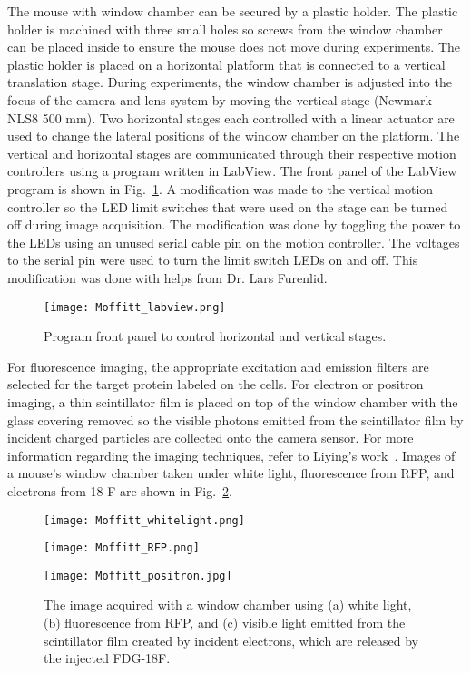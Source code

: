 The mouse with window chamber can be secured by a plastic holder.  The plastic holder is machined with three small holes so screws from the window chamber can be placed inside to ensure the mouse does not move during experiments.  The plastic holder is placed on a horizontal platform that is connected to a vertical translation stage.  During experiments, the window chamber is adjusted into the focus of the camera and lens system by moving the vertical stage (Newmark NLS8 500 mm).  Two horizontal stages each controlled with a linear actuator are used to change the lateral positions of the window chamber on the platform.  The vertical and horizontal stages are communicated through their respective motion controllers using a program written in LabView.  The front panel of the LabView program is shown in Fig.~\ref{fig:Labview}.  A modification was made to the vertical motion controller so the LED limit switches that were used on the stage can be turned off during image acquisition.  The modification was done by toggling the power to the LEDs using an unused serial cable pin on the motion controller.  The voltages to the serial pin were used to turn the limit switch LEDs on and off.  This modification was done with helps from Dr. Lars Furenlid.

\begin{figure}
\centering
\texttt{[image: Moffitt\_labview.png]}
\caption{Program front panel to control horizontal and vertical stages.}
\label{fig:Labview}
\end{figure}

For fluorescence imaging, the appropriate excitation and emission filters are selected for the target protein labeled on the cells.  For electron or positron imaging, a thin scintillator film is placed on top of the window chamber with the glass covering removed so the visible photons emitted from the scintillator film by incident charged particles are collected onto the camera sensor.  For more information regarding the imaging techniques, refer to Liying's work~\citep{Liying}.  Images of a mouse's window chamber taken under white light, fluorescence from RFP, and electrons from 18-F are shown in Fig.~\ref{fig:Moffitt_images}.

\begin{figure}
	\begin{minipage}{0.3\linewidth}
		\centering
		\texttt{[image: Moffitt\_whitelight.png]}
		\subcaption{}
	\end{minipage}
	\begin{minipage}{0.3\linewidth}
		\centering	
		\texttt{[image: Moffitt\_RFP.png]}
		\subcaption{}
	\end{minipage}
	\begin{minipage}{0.3\linewidth}
		\centering	
		\texttt{[image: Moffitt\_positron.jpg]}
		\subcaption{}
	\end{minipage}
	\caption{The image acquired with a window chamber using (a) white light, (b) fluorescence from RFP, and (c) visible light emitted from the scintillator film created by incident electrons, which are released by the injected FDG-18F.}
	\label{fig:Moffitt_images}
\end{figure}

